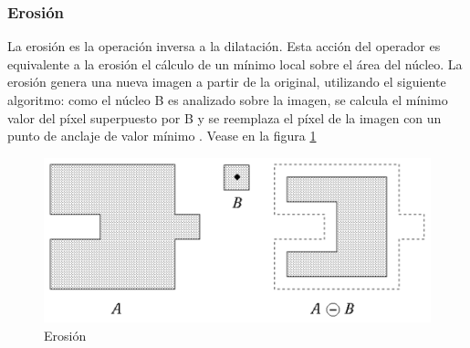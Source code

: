 \subsubsection{Erosión}
La erosión es la operación inversa a la dilatación. Esta acción del operador es equivalente a la erosión el cálculo de un mínimo local sobre el área del núcleo. La erosión genera una nueva imagen a partir de la original, utilizando el siguiente algoritmo: como el núcleo B es analizado sobre la imagen, se calcula el mínimo valor del píxel superpuesto por B y se reemplaza el píxel de la imagen con un punto de anclaje de valor mínimo \cite{BookOpenCv}. 
Vease en la figura \ref{fig:erosion}

\begin{figure}[hbtp]
\centering
\includegraphics[scale=0.5]{imagenes/erosion.png}
\caption{Erosión}
\label{fig:erosion}
\end{figure}


